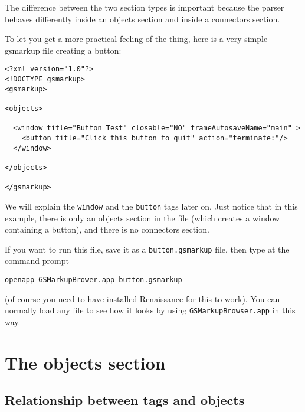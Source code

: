 The difference between the two section types is important because the
parser behaves differently inside an objects section and inside a
connectors section.

To let you get a more practical feeling of the thing, here is a very
simple gsmarkup file creating a button:
\begin{verbatim}
<?xml version="1.0"?>
<!DOCTYPE gsmarkup>
<gsmarkup>

<objects>

  <window title="Button Test" closable="NO" frameAutosaveName="main" >
    <button title="Click this button to quit" action="terminate:"/>
  </window>

</objects>

</gsmarkup>
\end{verbatim}
We will explain the \texttt{window} and the \texttt{button} tags later
on.  Just notice that in this example, there is only an objects
section in the file (which creates a window containing a button), and
there is no connectors section.

If you want to run this file, save it as a \texttt{button.gsmarkup} file,
then type at the command prompt
\begin{verbatim}
openapp GSMarkupBrower.app button.gsmarkup
\end{verbatim}
(of course you need to have installed Renaissance for this to work).  You
can normally load any file to see how it looks by using
\texttt{GSMarkupBrowser.app} in this way.

\section{The objects section}

\subsection{Relationship between tags and objects}


